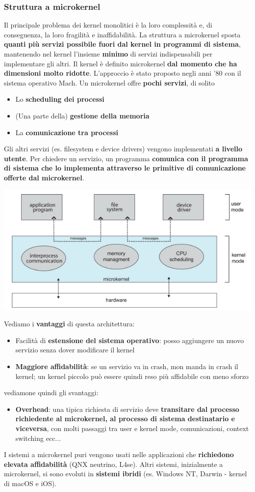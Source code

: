 \documentclass[12pt]{article}
\begin{document}
\subsubsection{Struttura a microkernel}
Il principale problema dei kernel monolitici è la loro complessità e, di conseguenza, la loro fragilità e inaffidabilità.
La struttura a microkernel sposta \textbf{quanti più servizi possibile fuori dal kernel in programmi di sistema}, mantenendo nel kernel l'insieme
\textbf{minimo} di servizi indispensabili per implementare gli altri.
Il kernel è definito microkernel \textbf{dal momento che ha dimensioni molto ridotte}.
L'approccio è stato proposto negli anni '80 con il sistema operativo Mach.
Un microkernel offre \textbf{pochi servizi}, di solito
\begin{itemize}
    \item Lo \textbf{scheduling dei processi}
    \item (Una parte della) \textbf{gestione della memoria}
    \item La \textbf{comunicazione tra processi}
\end{itemize}
Gli altri servizi (es. filesystem e device drivers) vengono implementati \textbf{a livello utente}.
Per chiedere un servizio, un programma \textbf{comunica con il programma di sistema che lo implementa attraverso le primitive di comunicazione offerte dal microkernel}.
\begin{center}
    \includegraphics[width = 0.80\linewidth]{Images/35.png}
\end{center}
Vediamo i \textbf{vantaggi} di questa architettura:
\begin{itemize}
    \item Facilità di \textbf{estensione del sistema operativo}: posso aggiungere un nuovo servizio senza dover modificare il kernel
    \item \textbf{Maggiore affidabilità}: se un servizio va in crash, mon manda in crash il kernel; un kernel piccolo può essere quindi reso più affidabile con meno sforzo
\end{itemize}
vediamone quindi gli svantaggi:
\begin{itemize}
    \item \textbf{Overhead}: una tipica richiesta di servizio deve \textbf{transitare dal processo richiedente al microkernel, al processo di sistema destinatario e viceversa}, con molti passaggi tra user e kernel mode, comunicazioni, context switching ecc...
\end{itemize}
I sistemi a microkernel puri vengono usati nelle applicazioni che \textbf{richiedono elevata affidabilità} (QNX neutrino, L4se). Altri sistemi, inizialmente a microkernel, si sono evoluti in \textbf{sistemi ibridi} (es. Windows NT, Darwin - kernel di macOS e iOS).
\end{document}
